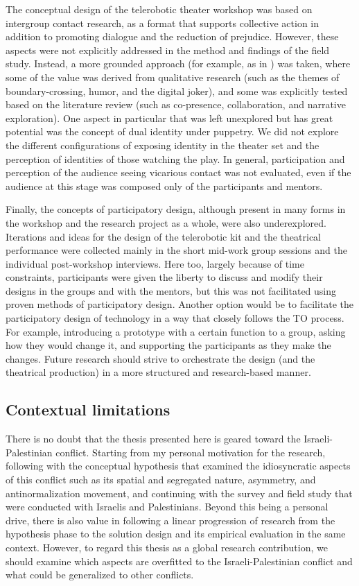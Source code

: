 \documentclass[dissertation,math,vertlayout,pdfa,colorlinks,nologo]{aaltoseries}
\begin{document}
The conceptual design of the telerobotic theater workshop was based on intergroup contact research, as a format that supports collective action in addition to promoting dialogue and the reduction of prejudice. However, these aspects were not explicitly addressed in the method and findings of the field study. Instead, a more grounded approach (for example, as in \cite{glaserBasicsGroundedTheory1992}) was taken, where some of the value was derived from qualitative research (such as the themes of boundary-crossing, humor, and the digital joker), and some was explicitly tested based on the literature review (such as co-presence, collaboration, and narrative exploration). One aspect in particular that was left unexplored but has great potential was the concept of dual identity under puppetry. We did not explore the different configurations of exposing identity in the theater set and the perception of identities of those watching the play. In general, participation and perception of the audience seeing vicarious contact was not evaluated, even if the audience at this stage was composed only of the participants and mentors.

Finally, the concepts of participatory design, although present in many forms in the workshop and the research project as a whole, were also underexplored. Iterations and ideas for the design of the telerobotic kit and the theatrical performance were collected mainly in the short mid-work group sessions and the individual post-workshop interviews. Here too, largely because of time constraints, participants were given the liberty to discuss and modify their designs in the groups and with the mentors, but this was not facilitated using proven methods of participatory design. Another option would be to facilitate the participatory design of technology in a way that closely follows the TO process. For example, introducing a prototype with a certain function to a group, asking how they would change it, and supporting the participants as they make the changes. Future research should strive to orchestrate the design (and the theatrical production) in a more structured and research-based manner.


\subsection{Contextual limitations}
There is no doubt that the thesis presented here is geared toward the Israeli-Palestinian conflict. Starting from my personal motivation for the research, following with the conceptual hypothesis that examined the idiosyncratic aspects of this conflict such as its spatial and segregated nature, asymmetry, and antinormalization movement, and continuing with the survey and field study that were conducted with Israelis and Palestinians. Beyond this being a personal drive, there is also value in following a linear progression of research from the hypothesis phase to the solution design and its empirical evaluation in the same context. However, to regard this thesis as a global research contribution, we should examine which aspects are overfitted to the Israeli-Palestinian conflict and what could be generalized to other conflicts.
\end{document}
